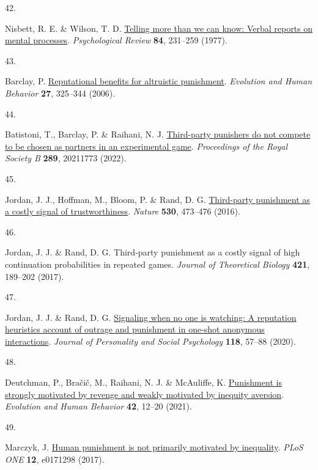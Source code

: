 \documentclass[
  man,floatsintext]{apa6}
\newlength{\cslhangindent}
\newlength{\csllabelwidth}
\newlength{\cslentryspacingunit} %
\newenvironment{CSLReferences}[2] %
 {%
  \setlength{\parindent}{0pt}
  \ifodd #1
  \let\oldpar\par
  \def\par{\hangindent=\cslhangindent\oldpar}
  \fi
  \setlength{\parskip}{#2\cslentryspacingunit}
 }%
 {}
\newcommand{\CSLLeftMargin}[1]{\parbox[t]{\csllabelwidth}{#1}}
\newcommand{\CSLRightInline}[1]{\parbox[t]{\linewidth - \csllabelwidth}{#1}\break}
\begin{document}
\begin{CSLReferences}{0}{0}
\leavevmode{}%
\CSLLeftMargin{42. }%
\CSLRightInline{Nisbett, R. E. \& Wilson, T. D. \href{https://doi.org/10.1037/0033-295X.84.3.231}{Telling more than we can know: Verbal reports on mental processes}. \emph{Psychological Review} \textbf{84}, 231--259 (1977).}

\leavevmode{}%
\CSLLeftMargin{43. }%
\CSLRightInline{Barclay, P. \href{https://doi.org/10.1016/j.evolhumbehav.2006.01.003}{Reputational benefits for altruistic punishment}. \emph{Evolution and Human Behavior} \textbf{27}, 325--344 (2006).}

\leavevmode{}%
\CSLLeftMargin{44. }%
\CSLRightInline{Batistoni, T., Barclay, P. \& Raihani, N. J. \href{https://doi.org/10.1098/rspb.2021.1773}{Third-party punishers do not compete to be chosen as partners in an experimental game}. \emph{Proceedings of the Royal Society B} \textbf{289}, 20211773 (2022).}

\leavevmode{}%
\CSLLeftMargin{45. }%
\CSLRightInline{Jordan, J. J., Hoffman, M., Bloom, P. \& Rand, D. G. \href{https://doi.org/10.1038/nature16981}{Third-party punishment as a costly signal of trustworthiness}. \emph{Nature} \textbf{530}, 473--476 (2016).}

\leavevmode{}%
\CSLLeftMargin{46. }%
\CSLRightInline{Jordan, J. J. \& Rand, D. G. Third-party punishment as a costly signal of high continuation probabilities in repeated games. \emph{Journal of Theoretical Biology} \textbf{421}, 189--202 (2017).}

\leavevmode{}%
\CSLLeftMargin{47. }%
\CSLRightInline{Jordan, J. J. \& Rand, D. G. \href{https://doi.org/10.1037/pspi0000186}{Signaling when no one is watching: A reputation heuristics account of outrage and punishment in one-shot anonymous interactions}. \emph{Journal of Personality and Social Psychology} \textbf{118}, 57--88 (2020).}

\leavevmode{}%
\CSLLeftMargin{48. }%
\CSLRightInline{Deutchman, P., Bračič, M., Raihani, N. J. \& McAuliffe, K. \href{https://doi.org/10.1016/j.evolhumbehav.2020.06.001}{Punishment is strongly motivated by revenge and weakly motivated by inequity aversion}. \emph{Evolution and Human Behavior} \textbf{42}, 12--20 (2021).}

\leavevmode{}%
\CSLLeftMargin{49. }%
\CSLRightInline{Marczyk, J. \href{https://doi.org/10.1371/journal.pone.0171298}{Human punishment is not primarily motivated by inequality}. \emph{PLoS ONE} \textbf{12}, e0171298 (2017).}


\end{CSLReferences}
\end{document}
